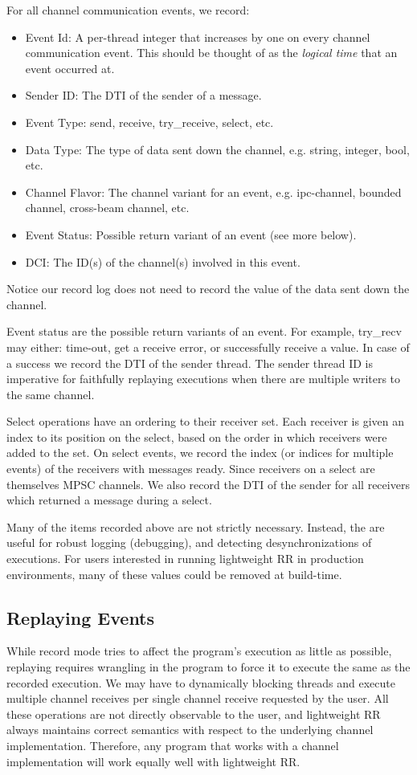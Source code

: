 \documentclass{article}
\begin{document}
For all channel communication events, we record:
\begin{itemize}
\item Event Id: A per-thread integer that increases by one on every channel communication
  event. This should be thought of as the \textit{logical time} that an event occurred at.
\item Sender ID: The DTI of the sender of a message.
\item Event Type: send, receive, try\_receive, select, etc.
\item Data Type: The type of data sent down the channel, e.g. string, integer, bool, etc.
\item Channel Flavor: The channel variant for an event, e.g. ipc-channel, bounded channel,
  cross-beam channel, etc.
\item Event Status: Possible return variant of an event (see more below).
\item DCI: The ID(s) of the channel(s) involved in this event.
\end{itemize}
Notice our record log does not need to record the value of the data sent down the channel.

Event status are the possible return variants of an event. For example, try\_recv
may either: time-out, get a receive error, or successfully receive a value. In case of a
success we record the DTI of the sender thread. The sender thread ID is
imperative for faithfully replaying executions when there are multiple writers
to the same channel.

Select operations have an ordering to their receiver set. Each receiver is given
an index to its position on the select, based on the order in which receivers were added to
the set. On select events, we record the index (or indices for multiple events) of the
receivers with messages ready. Since receivers on a select are themselves MPSC channels. We
also record the DTI of the sender for all receivers which returned a message during a select.

Many of the items recorded above are not strictly necessary. Instead, the are useful for
robust logging (debugging), and detecting desynchronizations of executions. For users
interested in running lightweight RR in production environments, many of these values could
be removed at build-time.

\subsection{Replaying Events}
While record mode tries to affect the program's execution as little as possible,
replaying requires wrangling in the program to force it to execute the same as the recorded
execution. We may have to dynamically blocking threads and execute multiple channel receives
per single channel receive requested by the user. All these operations are not directly
observable to the user, and lightweight RR always maintains correct semantics with respect
to the underlying channel implementation. Therefore, any program that works with a channel
implementation will work equally well with lightweight RR.
\end{document}
